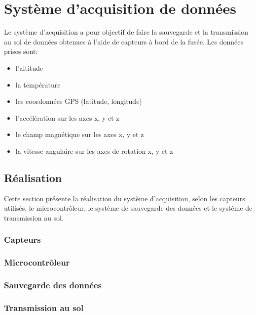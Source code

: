 \chapter{Système d'acquisition de données}
\label{chap:acquisition}

Le système d'acquisition a pour objectif de faire la sauvegarde et la
transmission au sol de données obtenues à l'aide de capteurs à bord de la fusée.
Les données prises sont:

\begin{itemize}
	\item l'altitude
	\item la température
	\item les coordonnées GPS (latitude, longitude)
	\item l'accélération sur les axes x, y et z
	\item le champ magnétique sur les axes x, y et z
	\item la vitesse angulaire sur les axes de rotation x, y et z
\end{itemize}


\section{Réalisation}

Cette section présente la réalisation du système d'acquisition, selon les
capteurs utilisés, le microcontrôleur, le système de sauvegarde des données et
le système de transmission au sol.

\subsection{Capteurs}



\subsection{Microcontrôleur}



\subsection{Sauvegarde des données}



\subsection{Transmission au sol}




